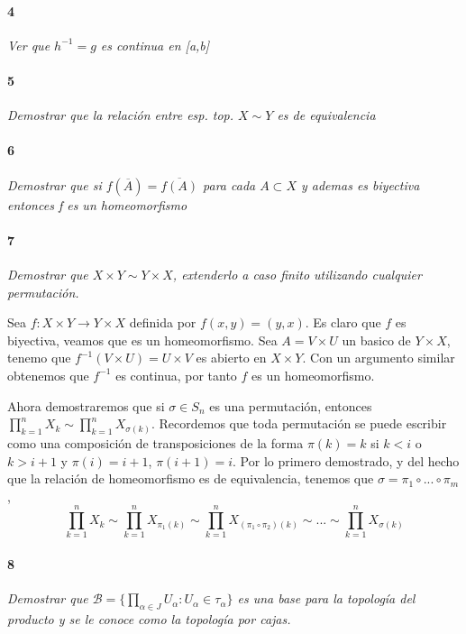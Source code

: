 \documentclass[12pt]{article}
\begin{document}
\paragraph{4}
\textit{Ver que $h^{-1}=g$ es continua en [a,b]}

\paragraph{5}
\textit{Demostrar que la relación entre esp. top. $X\sim Y$ es de equivalencia}

\paragraph{6}
\textit{Demostrar que si $f(\overline{A})=\overline{f(A)}$ para cada $A\subset X$ y ademas es biyectiva entonces f es un homeomorfismo}

\paragraph{7}
\textit{Demostrar que $X\times Y \sim Y \times X$, extenderlo a caso finito utilizando cualquier permutación.}

Sea $f: X \times Y \to Y \times X$ definida por $f(x,y)=(y,x)$. Es claro que $f$ es biyectiva, veamos que es un homeomorfismo. Sea $A=V \times U$ un basico de $Y \times X$, 
tenemo que $f^{-1}(V \times U)=U \times V$ es abierto en $X \times Y$. Con un argumento similar obtenemos que $f^{-1}$ es continua, por tanto $f$ es un homeomorfismo.

Ahora demostraremos que si $\sigma \in S_n$ es una permutación, entonces $\prod_{k=1}^{n} X_k \sim \prod_{k=1}^{n} X_{\sigma(k)}$.
Recordemos que toda permutación se puede escribir como una composición de transposiciones de la forma $\pi(k)=k$ si $k<i$ o $k>i+1$ y $\pi(i)=i+1$, $\pi(i+1)=i$. Por lo primero demostrado,
y del hecho que la relación de homeomorfismo es de equivalencia, tenemos que $\sigma=\pi_1 \circ ...\circ \pi_m$, $$\prod_{k=1}^{n} X_k \sim \prod_{k=1}^{n} X_{\pi_1(k)} \sim \prod_{k=1}^{n} X_{(\pi_1 \circ \pi_2)(k)} \sim ... \sim \prod_{k=1}^{n} X_{\sigma(k)}$$

\paragraph{8}
\textit{Demostrar que $\mathcal{B} = \{\prod\limits_{\alpha\in J}U_\alpha : U_\alpha\in\tau_\alpha\}$ es una base para la topología del producto y se le conoce como la topología por cajas.}
\end{document}
